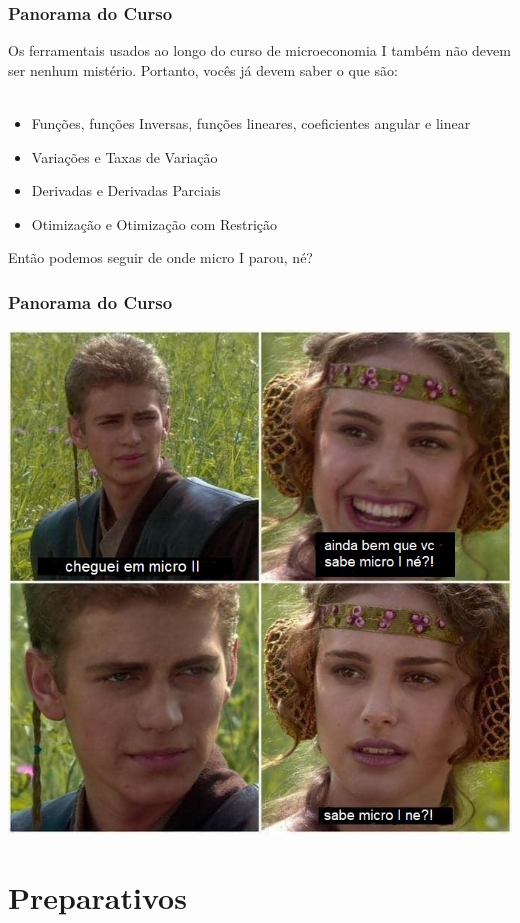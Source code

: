 \documentclass{beamer}[10]
\begin{document}
\begin{frame}
	\frametitle{Panorama do Curso}
	Os ferramentais usados ao longo do curso de microeconomia I também não devem ser nenhum mistério. Portanto, vocês já devem saber o que são:
	\\~\\
	\begin{itemize}
		\item Funções, funções Inversas, funções lineares, coeficientes angular e linear
		\item Variações e Taxas de Variação
		\item Derivadas e Derivadas Parciais
		\item Otimização e Otimização com Restrição
	\end{itemize}
	Então podemos seguir de onde micro I parou, né?
\end{frame}

\begin{frame}
	\frametitle{Panorama do Curso}
	\begin{center}
		\includegraphics[scale=0.4]{img01.jpg}
	\end{center}
\end{frame}

\section{Preparativos}
\end{document}
